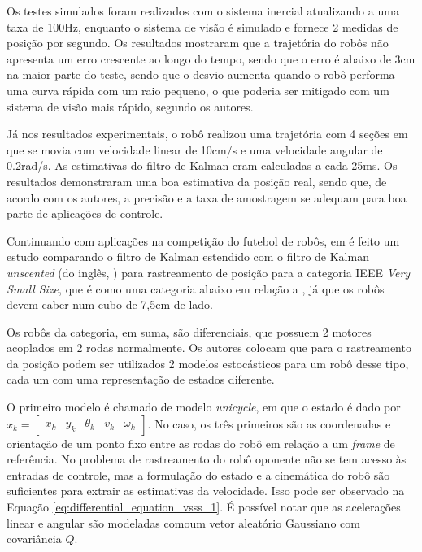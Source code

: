 \documentclass[acronym, symbols, table]{fei}
\begin{document}
	Os testes simulados foram realizados com o sistema inercial atualizando a uma taxa de 100Hz, enquanto o sistema de visão é simulado e fornece 2 medidas de posição por segundo. Os resultados mostraram que a trajetória do robôs não apresenta um erro crescente ao longo do tempo, sendo que o erro é abaixo de 3cm na maior parte do teste, sendo que o desvio aumenta quando o robô performa uma curva rápida com um raio pequeno, o que poderia ser mitigado com um sistema de visão mais rápido, segundo os autores.
	
	Já nos resultados experimentais, o robô realizou uma trajetória com 4 seções em que se movia com velocidade linear de 10cm/s e uma velocidade angular de 0.2rad/s. As estimativas do filtro de Kalman eram calculadas a cada 25ms. Os resultados demonstraram uma boa estimativa da posição real, sendo que, de acordo com os autores, a precisão e a taxa de amostragem se adequam para boa parte de aplicações de controle.
	
	Continuando com aplicações na competição do futebol de robôs, em \textcite{aguiar2017kalman} é feito um estudo comparando o filtro de Kalman estendido com o filtro de Kalman \textit{unscented} (do inglês, ) para rastreamento de posição para a categoria IEEE \textit{Very Small Size}, que é como uma categoria abaixo em relação a , já que os robôs devem caber num cubo de 7,5cm de lado.
	
	Os robôs da categoria, em suma, são diferenciais, que possuem 2 motores acoplados em 2 rodas normalmente. Os autores colocam que para o rastreamento da posição podem ser utilizados 2 modelos estocásticos para um robô desse tipo, cada um com uma representação de estados diferente. 
	
	O primeiro modelo é chamado de modelo \textit{unicycle}, em que o estado é dado por $x_k = \begin{bmatrix}
		x_k & y_k & \theta_k & v_k & \omega_k \end{bmatrix}$. No caso,  os três primeiros são as coordenadas e orientação de um ponto fixo entre as rodas do robô em relação a um \textit{frame} de referência. No problema de rastreamento do robô oponente não se tem acesso às entradas de controle, mas a formulação do estado e a cinemática do robô são suficientes para extrair as estimativas da velocidade. Isso pode ser observado na Equação \ref{eq:differential_equation_vsss_1}. É possível notar que as acelerações linear e angular são modeladas comoum vetor aleatório Gaussiano com covariância $Q$.
		
\end{document}
